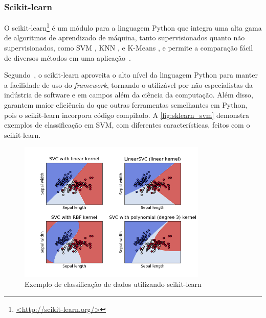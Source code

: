 \subsubsection{Scikit-learn}\label{sec:ml_sklearn}

O scikit-learn\footnote{\href{http://scikit-learn.org/}{<http://scikit-learn.org/>}} é um módulo para a linguagem Python que integra uma alta gama de algoritmos de aprendizado de máquina, tanto supervisionados quanto não supervisionados, como SVM \cite{cortes:1995svm}, KNN \cite{cover:1967knn}, e K-Means \cite{macqueen:1967kmeans}, e permite a comparação fácil de diversos métodos em uma aplicação~\cite{pedregosa:2011}.

Segundo~, o scikit-learn aproveita o alto nível da linguagem Python para manter a facilidade de uso do \textit{framework}, tornando-o utilizável por não especialistas da indústria de software e em campos além da ciência da computação. Além disso,~ garantem maior eficiência do que outras ferramentas semelhantes em Python, pois o scikit-learn incorpora código compilado. A \autoref{fig:sklearn_svm} demonstra exemplos de classificação em SVM, com diferentes características, feitos com o scikit-learn.

\begin{figure}[ht]
	\caption{\label{fig:sklearn_svm}Exemplo de classificação de dados utilizando scikit-learn}
	\begin{center}
	    \includegraphics[width=0.8\textwidth]{resources/sklearn_iris_svm.png}
	\end{center}
\end{figure}

